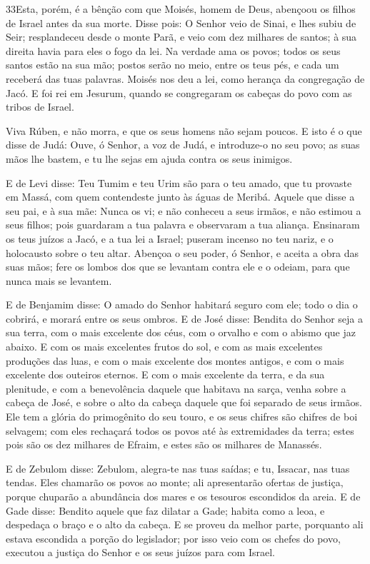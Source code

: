 \medskip

\lettrine{33} Esta, porém, é a bênção com que Moisés, homem de
Deus, abençoou os filhos de Israel antes da sua morte. Disse
pois: O Senhor veio de Sinai, e lhes subiu de Seir; resplandeceu
desde o monte Parã, e veio com dez milhares de santos; à sua direita
havia para eles o fogo da lei. Na verdade ama os povos; todos os
seus santos estão na sua mão; postos serão no meio, entre os teus
pés, e cada um receberá das tuas palavras. Moisés nos deu a lei,
como herança da congregação de Jacó. E foi rei em Jesurum,
quando se congregaram os cabeças do povo com as tribos de Israel.

Viva Rúben, e não morra, e que os seus homens não sejam poucos.
E isto é o que disse de Judá: Ouve, ó Senhor, a voz de Judá, e
introduze-o no seu povo; as suas mãos lhe bastem, e tu lhe sejas em
ajuda contra os seus inimigos.

E de Levi disse: Teu Tumim e teu Urim são para o teu amado, que tu
provaste em Massá, com quem contendeste junto às águas de Meribá.
Aquele que disse a seu pai, e à sua mãe: Nunca os vi; e não
conheceu a seus irmãos, e não estimou a seus filhos; pois guardaram
a tua palavra e observaram a tua aliança. Ensinaram os teus
juízos a Jacó, e a tua lei a Israel; puseram incenso no teu nariz, e
o holocausto sobre o teu altar. Abençoa o seu poder, ó
Senhor, e aceita a obra das suas mãos; fere os lombos dos que se
levantam contra ele e o odeiam, para que nunca mais se levantem.

E de Benjamim disse: O amado do Senhor habitará seguro com ele;
todo o dia o cobrirá, e morará entre os seus ombros. E de
José disse: Bendita do Senhor seja a sua terra, com o mais excelente
dos céus, com o orvalho e com o abismo que jaz abaixo. E com
os mais excelentes frutos do sol, e com as mais excelentes produções
das luas, e com o mais excelente dos montes antigos, e com o
mais excelente dos outeiros eternos. E com o mais excelente
da terra, e da sua plenitude, e com a benevolência daquele que
habitava na sarça, venha sobre a cabeça de José, e sobre o alto da
cabeça daquele que foi separado de seus irmãos. Ele tem a
glória do primogênito do seu touro, e os seus chifres são chifres de
boi selvagem; com eles rechaçará todos os povos até às extremidades
da terra; estes pois são os dez milhares de Efraim, e estes são os
milhares de Manassés.

E de Zebulom disse: Zebulom, alegra-te nas tuas saídas; e tu,
Issacar, nas tuas tendas. Eles chamarão os povos ao monte;
ali apresentarão ofertas de justiça, porque chuparão a abundância
dos mares e os tesouros escondidos da areia. E de Gade disse:
Bendito aquele que faz dilatar a Gade; habita como a leoa, e
despedaça o braço e o alto da cabeça. E se proveu da melhor
parte, porquanto ali estava escondida a porção do legislador; por
isso veio com os chefes do povo, executou a justiça do Senhor e os
seus juízos para com Israel.

